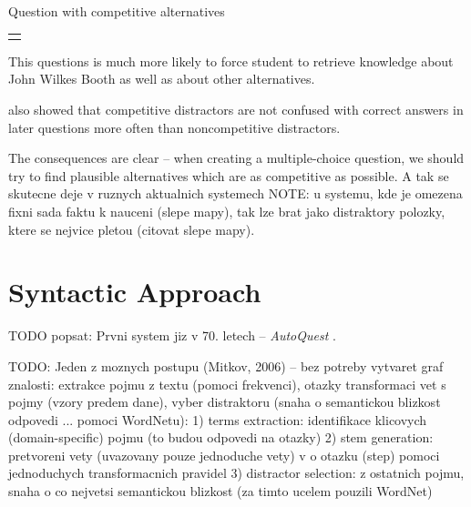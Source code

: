 \documentclass[a4paper, 12pt, twoside]{fithesis2}		%
\renewcommand{\_}{\leavevmode \kern0.0em\vbox{\hrule width0.4em}}
\newcounter{choice}
\renewcommand\thechoice{\Alph{choice}}
\newcommand\choicelabel{\thechoice.}
\newenvironment{choices}%
  {\vspace{0.2em}\list{\choicelabel}%
     {\usecounter{choice}\def\makelabel##1{\hss\llap{##1}}%
       \settowidth{\leftmargin}{W.\hskip\labelsep\hskip 0.01em}%
       \def\choice{%
         \item
       } %
       \labelwidth\leftmargin\advance\labelwidth-\labelsep
       \topsep=0pt
       \partopsep=0pt
     }%
  }%
  {\vspace{-0.7em}\endlist}
\newenvironment{question}
{
  \begin{center}
  \begin{tabular}{p{0.9\textwidth}}
  \vskip 0.05em
}
{
  \\
  \end{tabular}
  \end{center}
}
\newcommand{\sentenceGap}{\rule{1.5cm}{0.4pt}~}
\begin{document}
\begin{exercise}
\caption{Question with competitive alternatives}%
  \begin{question}
  Lincoln was assassinated by \sentenceGap , a Confederate sympathizer.
  \begin{choices}
    \choice Thomas N. Conrad
    \choice Robert E. Lee
    \choice John Wilkes Booth
    \choice Ward Hill Lamon
  \end{choices}
  \end{question}
\end{exercise}

This questions is much more likely to force student to retrieve knowledge about John Wilkes Booth as well as about other alternatives.

\cite{optimizing-multiple-choice} also showed that competitive distractors are not confused with correct answers in later questions more often than noncompetitive distractors.

The consequences are clear -- when creating a multiple-choice question, we should try to find plausible alternatives which are as competitive as possible.
A tak se skutecne deje v ruznych aktualnich systemech \cite{question-gen-mitkov, slepe-mapy}
NOTE: u systemu, kde je omezena fixni sada faktu k nauceni (slepe mapy), tak lze brat jako distraktory polozky, ktere se nejvice pletou (citovat slepe mapy).


\section{Syntactic Approach}
\label{sec:questions-syntactically}

TODO popsat: Prvni system jiz v 70. letech -- \textit{AutoQuest} \cite{questions-wolfe}.


TODO: Jeden z moznych postupu (Mitkov, 2006) \cite{question-gen-mitkov} -- bez potreby vytvaret graf znalosti:
extrakce pojmu z textu (pomoci frekvenci), otazky transformaci vet s pojmy (vzory predem dane), vyber distraktoru (snaha o semantickou blizkost odpovedi ... pomoci WordNetu):
1) terms extraction: identifikace klicovych (domain-specific) pojmu (to budou odpovedi na otazky)
2) stem generation: pretvoreni vety (uvazovany pouze jednoduche vety) v o otazku (step) pomoci jednoduchych transformacnich pravidel
3) distractor selection: z ostatnich pojmu, snaha o co nejvetsi semantickou blizkost (za timto ucelem pouzili WordNet)
\end{document}
